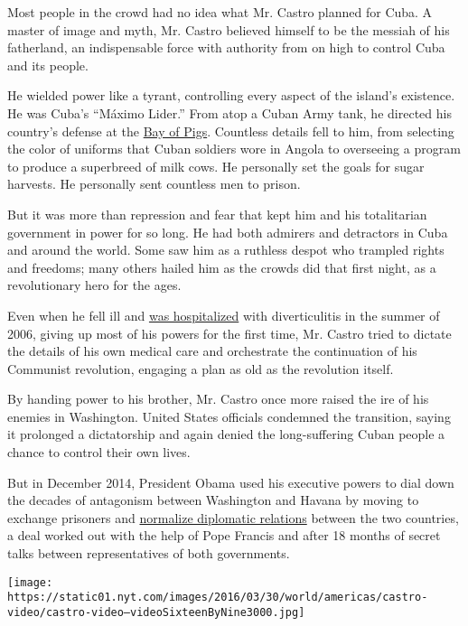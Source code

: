 Most people in the crowd had no idea what Mr. Castro planned for Cuba. A
master of image and myth, Mr. Castro believed himself to be the messiah
of his fatherland, an indispensable force with authority from on high to
control Cuba and its people.

He wielded power like a tyrant, controlling every aspect of the island's
existence. He was Cuba's ``Máximo Lider.'' From atop a Cuban Army tank,
he directed his country's defense at the
\href{http://learning.blogs.nytimes.com/2012/04/17/april-17-1961-the-bay-of-pigs-invasion-against-castro/}{Bay
of Pigs}. Countless details fell to him, from selecting the color of
uniforms that Cuban soldiers wore in Angola to overseeing a program to
produce a superbreed of milk cows. He personally set the goals for sugar
harvests. He personally sent countless men to prison.

But it was more than repression and fear that kept him and his
totalitarian government in power for so long. He had both admirers and
detractors in Cuba and around the world. Some saw him as a ruthless
despot who trampled rights and freedoms; many others hailed him as the
crowds did that first night, as a revolutionary hero for the ages.

Even when he fell ill and
\href{http://www.nytimes.com/2007/01/16/world/americas/16fidel.html}{was
hospitalized} with diverticulitis in the summer of 2006, giving up most
of his powers for the first time, Mr. Castro tried to dictate the
details of his own medical care and orchestrate the continuation of his
Communist revolution, engaging a plan as old as the revolution itself.

By handing power to his brother, Mr. Castro once more raised the ire of
his enemies in Washington. United States officials condemned the
transition, saying it prolonged a dictatorship and again denied the
long-suffering Cuban people a chance to control their own lives.

But in December 2014, President Obama used his executive powers to dial
down the decades of antagonism between Washington and Havana by moving
to exchange prisoners and
\href{http://www.nytimes.com/2014/12/18/world/americas/us-cuba-relations.html}{normalize
diplomatic relations} between the two countries, a deal worked out with
the help of Pope Francis and after 18 months of secret talks between
representatives of both governments.

\texttt{[image: https://static01.nyt.com/images/2016/03/30/world/americas/castro-video/castro-video--videoSixteenByNine3000.jpg]}


